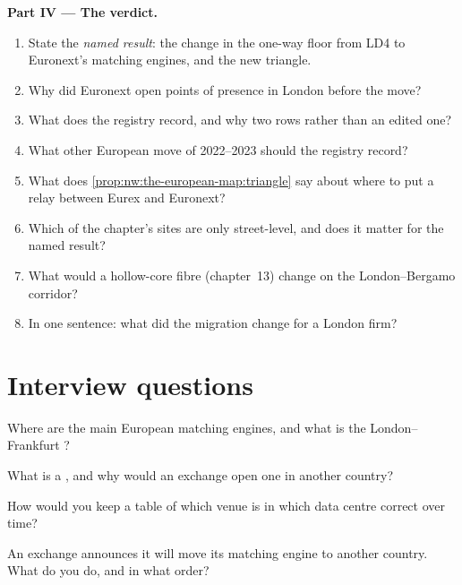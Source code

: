 \begin{problem}
\medskip\noindent\textbf{Part IV --- The verdict.}
\begin{enumerate}[resume]
\item State the \emph{named result}: the change in the one-way floor from LD4 to Euronext's matching engines, and the new triangle.
\item Why did Euronext open points of presence in London before the move?
\item What does the registry record, and why two rows rather than an edited one?
\item What other European move of 2022--2023 should the registry record?
\item What does \cref{prop:nw:the-european-map:triangle} say about where to put a relay between Eurex and Euronext?
\item Which of the chapter's sites are only street-level, and does it matter for the named result?
\item What would a hollow-core fibre (chapter~13) change on the London--Bergamo corridor?
\item In one sentence: what did the migration change for a London firm?
\end{enumerate}
\end{problem}

\section{Interview questions}

\begin{interviewq}\label{iq:nw:the-european-map:1}
Where are the main European matching engines, and what is the London--Frankfurt ?
\end{interviewq}

\begin{interviewq}\label{iq:nw:the-european-map:2}
What is a , and why would an exchange open one in another country?
\end{interviewq}

\begin{interviewq}\label{iq:nw:the-european-map:3}
How would you keep a table of which venue is in which data centre correct over time?
\end{interviewq}

\begin{interviewq}\label{iq:nw:the-european-map:4}
An exchange announces it will move its matching engine to another country. What do you do, and in what order?
\end{interviewq}


